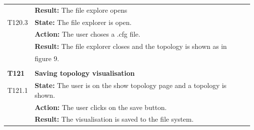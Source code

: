 \documentclass[parskip=full]{scrartcl}
\begin{document}
\begin{tabular}{p{2cm}p{11.4cm}}
& \textbf{Result:} The file explore opens\\
T120.3 & \textbf{State:} The file explorer is open.\\
& \textbf{Action:} The user choses a .cfg file.\\
& \textbf{Result:} The file explorer closes and the topology is shown as in \\
& figure 9. \\
& \\
\textbf{T121} \hypertarget{T121}& \textbf{Saving topology visualisation}\\
T121.1 & \textbf{State:} The user is on the show topology page and a topology is shown.\\
& \textbf{Action:} The user clicks on the save button.\\
& \textbf{Result:} The visualisation is saved to the file system.\\
\end{tabular}
\newpage
\end{document}
